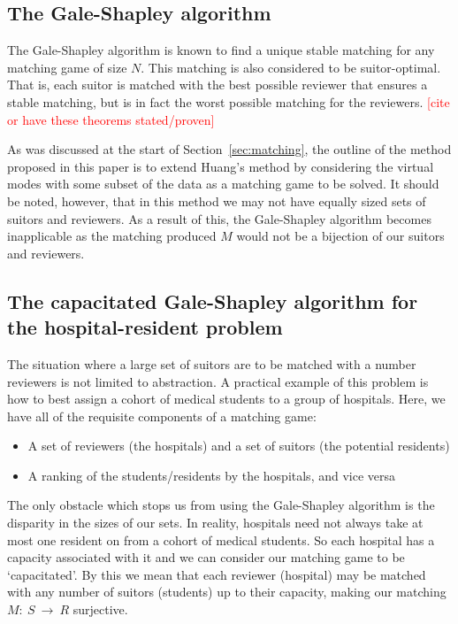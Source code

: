 %

\subsection{The Gale-Shapley algorithm}\label{subsec:galeshapley}

The Gale-Shapley algorithm is known to find a unique stable matching for any 
matching game of size \(N\). This matching is also considered to be 
suitor-optimal. That is, each suitor is matched with the best possible reviewer
that ensures a stable matching, but is in fact the worst possible matching for 
the reviewers. \textcolor{red}{[cite or have these theorems stated/proven]} 

As was discussed at the start of Section~\ref{sec:matching}, the outline of
the method proposed in this paper is to extend Huang's method by considering the
virtual modes with some subset of the data as a matching game to be solved. It
should be noted, however, that in this method we may not have equally sized 
sets of suitors and reviewers. As a result of this, the Gale-Shapley algorithm 
becomes inapplicable as the matching produced \(M\) would not be a bijection of 
our suitors and reviewers.

\subsection{The capacitated Gale-Shapley algorithm for the hospital-resident 
	problem}\label{subsec:capacitated_galeshapley}

The situation where a large set of suitors are to be matched with a number
reviewers is not limited to abstraction. A practical example of this problem is
how to best assign a cohort of medical students to a group of hospitals. Here, 
we have all of the requisite components of a matching game:

\begin{itemize}
	\item A set of reviewers (the hospitals) and a set of suitors (the potential
        residents) 
	\item A ranking of the students/residents by the hospitals, and vice versa
\end{itemize}

The only obstacle which stops us from using the Gale-Shapley algorithm is the 
disparity in the sizes of our sets. In reality, hospitals need not always take 
at most one resident on from a cohort of medical students. So each hospital has
a capacity associated with it and we can consider our matching game to be
`capacitated'. By this we mean that each reviewer (hospital) may be matched with
any number of suitors (students) up to their capacity, making our matching
\(M:~S~\to~R\) surjective.

